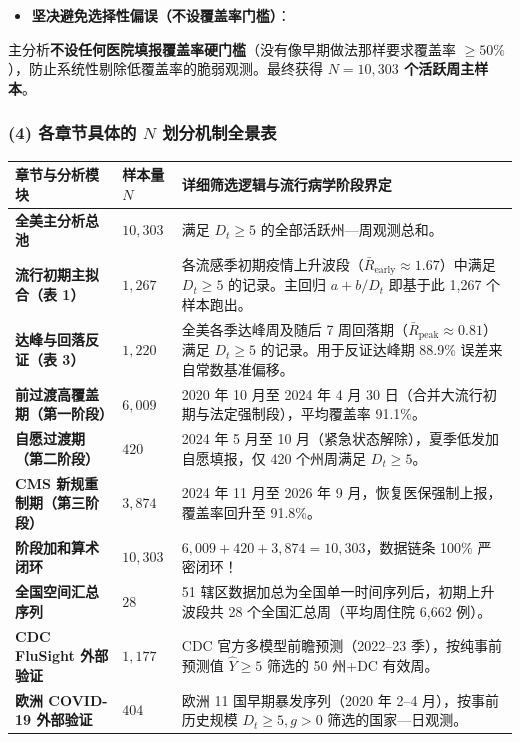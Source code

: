 \documentclass[11pt,a4paper]{ctexart}
\begin{document}
\begin{itemize}[leftmargin=2em, itemsep=2pt, parsep=0pt]
\item \textbf{坚决避免选择性偏误（不设覆盖率门槛）}：
\end{itemize}
主分析\textbf{不设任何医院填报覆盖率硬门槛}（没有像早期做法那样要求覆盖率 $\ge 50\%$），防止系统性剔除低覆盖率的脆弱观测。最终获得 \textbf{$N = 10,303$ 个活跃周主样本}。


\subsubsection{(4) 各章节具体的 $N$ 划分机制全景表}

\begin{table}[htbp]
\centering
\small
\begin{tabular}{lll}
\toprule
\textbf{章节与分析模块} & \textbf{样本量 $N$} & \textbf{详细筛选逻辑与流行病学阶段界定} \\
\midrule
\textbf{全美主分析总池} & \textbf{$10,303$} & 满足 $D_t \ge 5$ 的全部活跃州—周观测总和。 \\
\textbf{流行初期主拟合（表 1）} & \textbf{$1,267$} & 各流感季初期疫情上升波段（$\bar{R}_{\text{early}} \approx 1.67$）中满足 $D_t \ge 5$ 的记录。主回归 $a + b/D_t$ 即基于此 1,267 个样本跑出。 \\
\textbf{达峰与回落反证（表 3）} & \textbf{$1,220$} & 全美各季达峰周及随后 7 周回落期（$\bar{R}_{\text{peak}} \approx 0.81$）满足 $D_t \ge 5$ 的记录。用于反证达峰期 88.9\% 误差来自常数基准偏移。 \\
\textbf{前过渡高覆盖期（第一阶段）} & \textbf{$6,009$} & 2020 年 10 月至 2024 年 4 月 30 日（合并大流行初期与法定强制段），平均覆盖率 91.1\%。 \\
\textbf{自愿过渡期（第二阶段）} & \textbf{$420$} & 2024 年 5 月至 10 月（紧急状态解除），夏季低发加自愿填报，仅 420 个州周满足 $D_t \ge 5$。 \\
\textbf{CMS 新规重制期（第三阶段）} & \textbf{$3,874$} & 2024 年 11 月至 2026 年 9 月，恢复医保强制上报，覆盖率回升至 91.8\%。 \\
\textbf{阶段加和算术闭环} & \textbf{$10,303$} & \textbf{$6,009 + 420 + 3,874 = 10,303$}，数据链条 100\% 严密闭环！ \\
\textbf{全国空间汇总序列} & \textbf{$28$} & 51 辖区数据加总为全国单一时间序列后，初期上升波段共 28 个全国汇总周（平均周住院 6,662 例）。 \\
\textbf{CDC FluSight 外部验证} & \textbf{$1,177$} & CDC 官方多模型前瞻预测（2022–23 季），按纯事前预测值 $\widehat{Y} \ge 5$ 筛选的 50 州+DC 有效周。 \\
\textbf{欧洲 COVID-19 外部验证} & \textbf{$404$} & 欧洲 11 国早期暴发序列（2020 年 2–4 月），按事前历史规模 $D_t \ge 5, g>0$ 筛选的国家—日观测。 \\
\bottomrule
\end{tabular}
\end{table}
\end{document}
